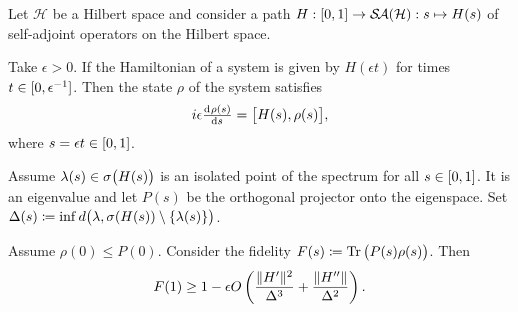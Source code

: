 \begin{theorem}
Let $\mathcal{H}$ be a Hilbert space and consider a path $H: \interval{0,1}\to \SelfAdjoints(\mathcal{H}): s\mapsto H(s)$ of self-adjoint operators on the Hilbert space.

Take $\epsilon >0$. If the Hamiltonian of a system is given by $H(\epsilon t)$ for times $t\in \interval{0,\epsilon^{-1}}$. Then the state $\rho$ of the system satisfies
\[ i\epsilon \od{\rho(s)}{s} = \big[H(s), \rho(s)\big], \]
where $s = \epsilon t \in \interval{0,1}$.

Assume $\lambda(s)\in \sigma\big(H(s)\big)$ is an isolated point of the spectrum for all $s\in \interval{0,1}$. It is an eigenvalue and let $P(s)$ be the orthogonal projector onto the eigenspace. Set $\Delta(s) \coloneqq \inf d\big(\lambda, \sigma(H(s))\setminus\{\lambda(s)\}\big)$.

Assume $\rho(0) \leq P(0)$. Consider the fidelity $F(s) \coloneqq \operatorname{Tr}\big(P(s)\rho(s)\big)$. Then
\[ F(1) \geq 1 - \epsilon O\left(\frac{\lVert H'\rVert^2}{\Delta^3} + \frac{\lVert H^{\prime\prime}\rVert}{\Delta^2}\right). \]
\end{theorem}
